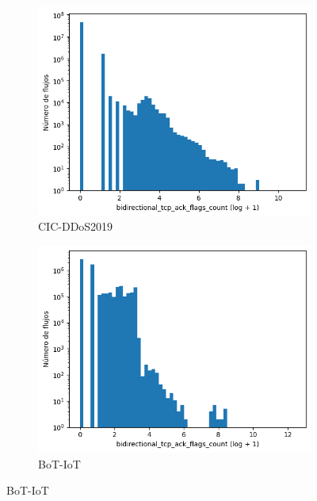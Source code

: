 \begin{figure}[H]
    \centering
    \begin{subfigure}[b]{0.32\textwidth}
        \centering
        \includegraphics[width=\textwidth]{media/packet_pincer_cicddos/bidirectional_tcp_ack_flags_count_log_x_log_y.png}
        \caption{CIC-DDoS2019}
    \end{subfigure}
    \hfill
    \begin{subfigure}[b]{0.32\textwidth}
        \centering
        \includegraphics[width=\linewidth]{media/packet_pincer_botiot/bidirectional_tcp_ack_flags_count_log_x_log_y.png}
        \caption{BoT-IoT}
    \end{subfigure}
    \hfill

\end{figure}
